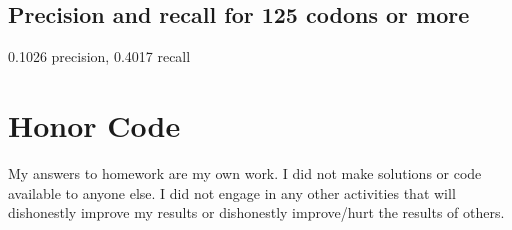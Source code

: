 \documentclass[a4paper,11pt]{article}
\begin{document}
\subsection{Precision and recall for 125 codons or more}
0.1026 precision, 0.4017 recall

\section*{Honor Code}


My answers to homework are my own work. I did not make solutions or code available to anyone else. I did not engage in any other activities that will dishonestly improve my results or dishonestly improve/hurt the results of others.
\end{document}

